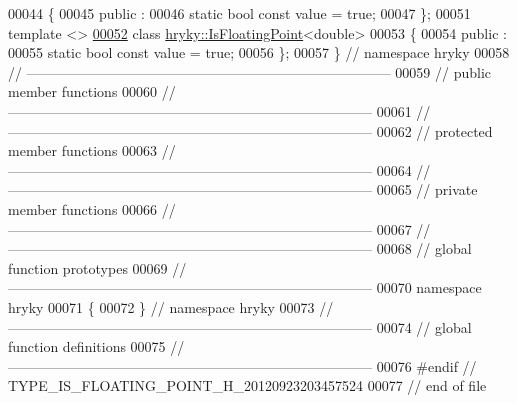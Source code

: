 \begin{DoxyCode}
00044 \{
00045 \textcolor{keyword}{public} :
00046     \textcolor{keyword}{static} \textcolor{keywordtype}{bool} \textcolor{keyword}{const} value = \textcolor{keyword}{true};
00047 \};
00051 \textcolor{keyword}{template} <>
\hypertarget{is__floating__point_8h_source_l00052}{}\hyperlink{classhryky_1_1hryky_1_1_is_floating_point_3_01double_01_4}{00052} \textcolor{keyword}{class }\hyperlink{classhryky_1_1_is_floating_point}{hryky::IsFloatingPoint}<double>
00053 \{
00054 \textcolor{keyword}{public} :
00055     \textcolor{keyword}{static} \textcolor{keywordtype}{bool} \textcolor{keyword}{const} value = \textcolor{keyword}{true};
00056 \};
00057 \} \textcolor{comment}{// namespace hryky}
00058 \textcolor{comment}{//
      ------------------------------------------------------------------------------}
00059 \textcolor{comment}{// public member functions}
00060 \textcolor{comment}{//
      ------------------------------------------------------------------------------}
00061 \textcolor{comment}{//
      ------------------------------------------------------------------------------}
00062 \textcolor{comment}{// protected member functions}
00063 \textcolor{comment}{//
      ------------------------------------------------------------------------------}
00064 \textcolor{comment}{//
      ------------------------------------------------------------------------------}
00065 \textcolor{comment}{// private member functions}
00066 \textcolor{comment}{//
      ------------------------------------------------------------------------------}
00067 \textcolor{comment}{//
      ------------------------------------------------------------------------------}
00068 \textcolor{comment}{// global function prototypes}
00069 \textcolor{comment}{//
      ------------------------------------------------------------------------------}
00070 \textcolor{keyword}{namespace }hryky
00071 \{
00072 \} \textcolor{comment}{// namespace hryky}
00073 \textcolor{comment}{//
      ------------------------------------------------------------------------------}
00074 \textcolor{comment}{// global function definitions}
00075 \textcolor{comment}{//
      ------------------------------------------------------------------------------}
00076 \textcolor{preprocessor}{#endif // TYPE\_IS\_FLOATING\_POINT\_H\_20120923203457524}
00077 \textcolor{preprocessor}{}\textcolor{comment}{// end of file}
\end{DoxyCode}
